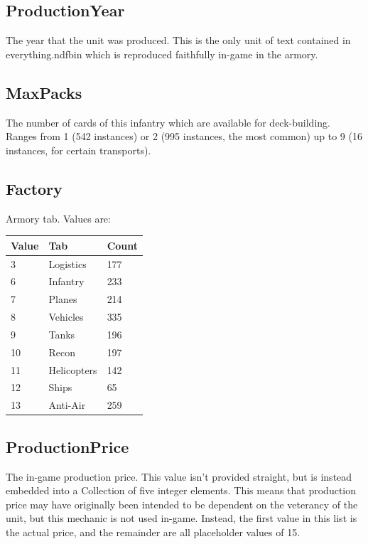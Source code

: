 \documentclass{article}
\begin{document}
\subsection{ProductionYear}

The year that the unit was produced. This is the only unit of text contained in everything.ndfbin which is reproduced faithfully in-game in the armory.

\subsection{MaxPacks}

The number of cards of this infantry which are available for deck-building. Ranges from 1 (542 instances) or 2 (995 instances, the most common) up to 9 (16 instances, for certain transports).

\subsection{Factory}

Armory tab. Values are:

\begin{center}
    \begin{tabular}{ | l | l | l |}
    \hline
	Value & Tab & Count\\ \hline
	3 & Logistics & 177\\
	6 & Infantry & 233\\
	7 & Planes & 214\\
	8 & Vehicles & 335\\
	9 & Tanks & 196\\
	10 & Recon & 197\\
	11 & Helicopters & 142\\
	12 & Ships & 65\\
	13 & Anti-Air & 259\\
    \hline
    \end{tabular}
\end{center}

\subsection{ProductionPrice}

The in-game production price. This value isn't provided straight, but is instead embedded into a Collection of five integer elements. This means that production price may have originally been intended to be dependent on the veterancy of the unit, but this mechanic is not used in-game. Instead, the first value in this list is the actual price, and the remainder are all placeholder values of 15.
\end{document}
